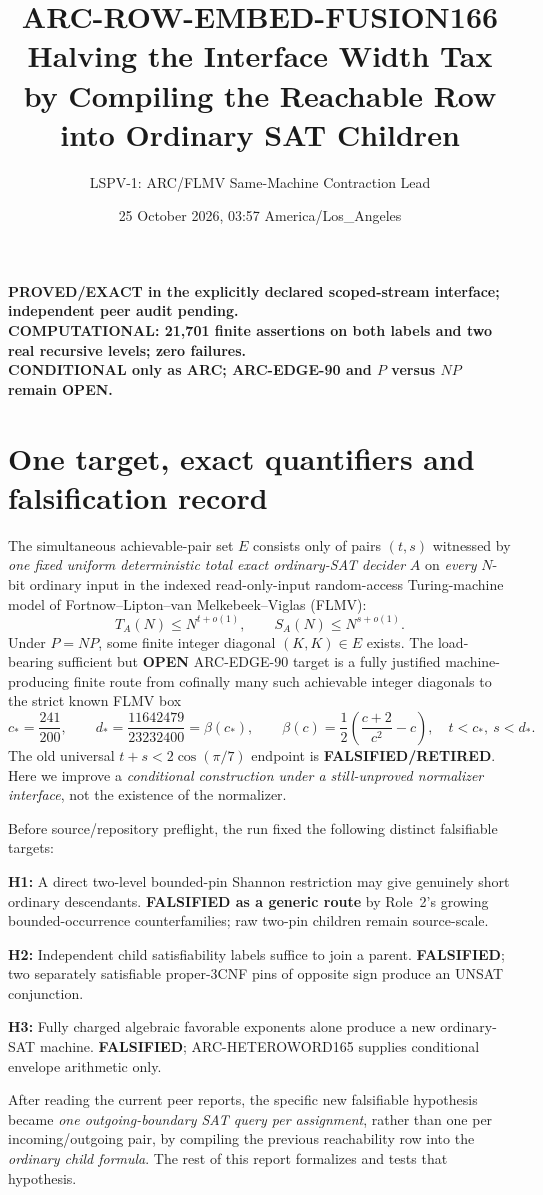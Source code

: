 \documentclass[11pt]{article}
\title{ARC-ROW-EMBED-FUSION166\\\large Halving the Interface Width Tax by Compiling the Reachable Row into Ordinary SAT Children}
\author{LSPV-1: ARC/FLMV Same-Machine Contraction Lead}
\date{25 October 2026, 03:57 America/Los\_Angeles}
\newcommand{\OPEN}{\textbf{OPEN}}
\begin{document}
\maketitle
\begin{center}
\textbf{PROVED/EXACT in the explicitly declared scoped-stream interface; independent peer audit pending.}\\
\textbf{COMPUTATIONAL: 21,701 finite assertions on both labels and two real recursive levels; zero failures.}\\
\textbf{CONDITIONAL only as ARC; ARC-EDGE-90 and $P$ versus $NP$ remain OPEN.}
\end{center}

\section{One target, exact quantifiers and falsification record}
The simultaneous achievable-pair set $E$ consists only of pairs $(t,s)$ witnessed by
\emph{one fixed uniform deterministic total exact ordinary-SAT decider} $A$ on
\emph{every} $N$-bit ordinary input in the indexed read-only-input random-access
Turing-machine model of Fortnow--Lipton--van Melkebeek--Viglas (FLMV):
\[
T_A(N)\le N^{t+o(1)},\qquad S_A(N)\le N^{s+o(1)}.
\]
Under $P=NP$, some finite integer diagonal $(K,K)\in E$ exists.  The
load-bearing sufficient but \OPEN{} ARC-EDGE-90 target is a fully justified
machine-producing finite route from cofinally many such achievable integer
diagonals to the strict known FLMV box
\[
c_*=\frac{241}{200},\qquad d_*=\frac{11642479}{23232400}
=\beta(c_*),\qquad \beta(c)=\frac12\left(\frac{c+2}{c^2}-c\right),
\quad t<c_*,\ s<d_*.
\]
The old universal $t+s<2\cos(\pi/7)$ endpoint is
\textbf{FALSIFIED/RETIRED}.  Here we improve a \emph{conditional construction
under a still-unproved normalizer interface}, not the existence of the
normalizer.

Before source/repository preflight, the run fixed the following distinct
falsifiable targets:
\begin{description}[leftmargin=0pt]
\item[] \textbf{H1:} A direct two-level bounded-pin Shannon restriction
may give genuinely short ordinary descendants. \textbf{FALSIFIED as a
generic route} by Role~2's growing bounded-occurrence counterfamilies;
raw two-pin children remain source-scale.
\item[] \textbf{H2:} Independent child satisfiability labels suffice to
join a parent. \textbf{FALSIFIED}; two separately satisfiable
proper-3CNF pins of opposite sign produce an UNSAT conjunction.
\item[] \textbf{H3:} Fully charged algebraic favorable exponents alone
produce a new ordinary-SAT machine. \textbf{FALSIFIED};
ARC-HETEROWORD165 supplies conditional envelope arithmetic only.
\end{description}
After reading the current peer reports, the specific new falsifiable
hypothesis became \emph{one outgoing-boundary SAT query per assignment},
rather than one per incoming/outgoing pair, by compiling the previous
reachability row into the \emph{ordinary child formula}.
The rest of this report formalizes and tests that hypothesis.
\end{document}
